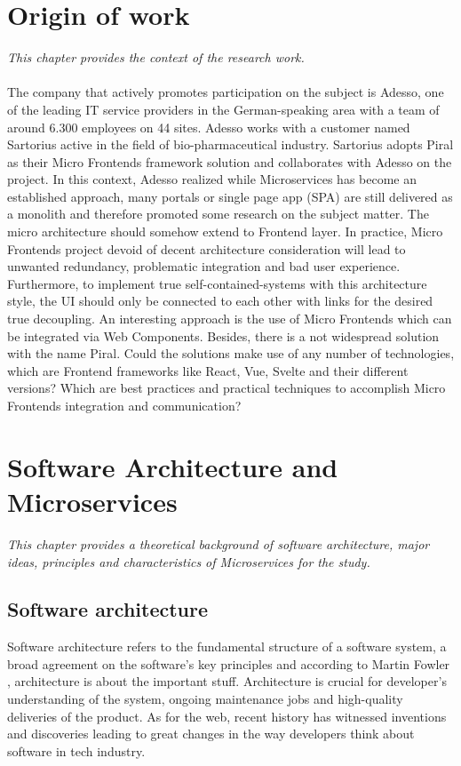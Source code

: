\documentclass[a4paper]{book}
\begin{document}
\chapter{Origin of work}
\textit{This chapter provides the context of the research work.} 
\\ \\
The company that actively promotes participation on the subject is Adesso, one of the leading IT service providers in the German-speaking area with a team of around 6.300 employees on 44 sites. Adesso works with a customer named Sartorius active in the field of bio-pharmaceutical industry. Sartorius adopts Piral as their Micro Frontends framework solution and collaborates with Adesso on the project. In this context, Adesso realized while Microservices has become an established approach, many portals or single page app (SPA) are still delivered as a monolith and therefore promoted some research on the subject matter. The micro architecture should somehow extend to Frontend layer. In practice, Micro Frontends project devoid of decent architecture consideration will lead to unwanted redundancy, problematic integration and bad user experience. Furthermore, to implement true self-contained-systems with this architecture style, the UI should only be connected to each other with links for the desired true decoupling. An interesting approach is the use of Micro Frontends which can be integrated via Web Components. Besides, there is a not widespread solution with the name Piral.  Could the solutions make use of any number of technologies, which are Frontend frameworks like React, Vue, Svelte and their different versions? Which are best practices and practical techniques to accomplish Micro Frontends integration and communication?


\chapter{Software Architecture and Microservices}
\textit{This chapter provides a theoretical background of software architecture, major ideas, principles and characteristics of Microservices for the study.}
\section{Software architecture}
Software architecture refers to the fundamental structure of a software system, a broad agreement on the software's key principles and according to Martin Fowler \cite{SA}, architecture is about the important stuff. Architecture is crucial for developer's understanding of the system, ongoing maintenance jobs and high-quality deliveries of the product. As for the web, recent history has witnessed inventions and discoveries leading to great changes in the way developers think about software in tech industry.
\end{document}
